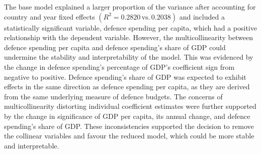 \begin{table}[ht]
\small
\caption{Robustness check}
\centering
{}
\label{tab:robustness}
\end{table}

The base model explained a larger proportion of the variance after accounting for 
country and year fixed effects
$(R^2 = 0.2820\, \text{vs.} \,0.2038)$
and included a statistically significant variable, defence spending per capita, which had a positive 
relationship with the dependent variable. However, the multicollinearity between defence spending per 
capita and defence spending's share of GDP could undermine the stability and interpretability 
of the model. This was evidenced by the change in defence spending's percentage of GDP's 
coefficient sign from negative to positive. Defence spending's share of GDP was expected to exhibit 
effects in the same direction as defence spending per capita, as they are derived from the same underlying 
measure of defence budgets.
The concerns of multicollinearity distorting individual coefficient estimates 
were further supported by the change in significance of 
GDP per capita, its annual change, and defence spending's share of GDP.
These inconsistencies supported the decision to remove the collinear variables and 
favour the reduced model, which could be more stable and interpretable.

